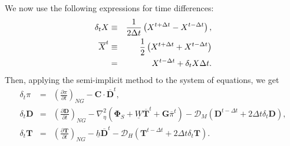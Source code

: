 We now use the following expressions for time differences:
\begin{eqnarray}
  \delta_{t} {X} &\equiv & \frac{1}{2 \Delta t}
        \left( {X}^{t+\Delta t} - {X}^{t-\Delta t} \right), \\
    \overline{X}^{t} &\equiv & \frac{1}{2} \left( {X}^{t+\Delta t}  + {X}^{t-\Delta t} \right)\notag\\
  &=&  {X}^{t-\Delta t} + \delta_{t} {X} \Delta t.
\end{eqnarray}
Then, applying the semi-implicit method to the system of equations, we get
\begin{eqnarray}
\label{eqn_for_pi}
  \delta_{t} \pi &=&
          \left( \frac{\partial \pi}{\partial t} \right)_{NG}
     - {\mathbf{C}} \cdot \overline{ {\mathbf{D}} }^{t}, \\
  \delta_{t} {\mathbf{D}} &=&
          \left( \frac{\partial {\mathbf{D}}}{\partial t} \right)_{NG}
          - \nabla^{2}_{\eta} ( {\mathbf{\Phi}}_{S}
                                  + \underline{W}
                                     \overline{ {\mathbf{T}} }^{t}
                                  + {\mathbf{G}}
                                  \overline{\pi}^{t} )
          - {\mathcal D}_M ( {\mathbf{D}}^{t-\Delta t}
                         + 2 \Delta t \delta_{t} {\mathbf{D}} ), \\
\label{eqn_for_t}
  \delta_{t} {\mathbf{T}} &=&
        \left( \frac{\partial {\mathbf{T}}}{\partial t} \right)_{NG}
         - \underline{h} \overline{ {\mathbf{D}} }^{t}
         - {\mathcal D}_H ( {\mathbf{T}}^{t-\Delta t}
                        + 2 \Delta t \delta_{t} {\mathbf{T}} ).
\end{eqnarray}

